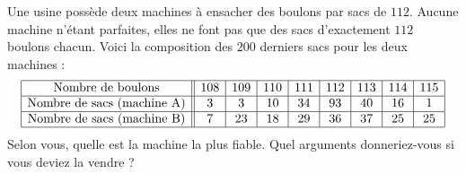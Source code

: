 
\begin{exercice}\label{exosmath-0378}

    Une usine possède deux machines à ensacher des boulons par sacs de \( 112\).  Aucune machine n'étant parfaites, elles ne font pas que des sacs d'exactement \( 112\) boulons chacun. Voici la composition des \( 200\) derniers sacs pour les deux machines :
    \begin{equation*}
        \begin{array}[]{|c||c|c|c|c|c|c|c|c|}
            \hline
            \text{Nombre de boulons}&108&109&110&111&112&113&114&115\\
            \hline
            \text{Nombre de sacs (machine A)}&3&3&10&34&93&40&16&1\\
            \hline
            \text{Nombre de sacs (machine B)}&7&23&18&29&36&37&25&25\\
            \hline
        \end{array}
    \end{equation*}
    Selon vous, quelle est la machine la plus fiable. Quel arguments donneriez-vous si vous deviez la vendre ?


\end{exercice}
